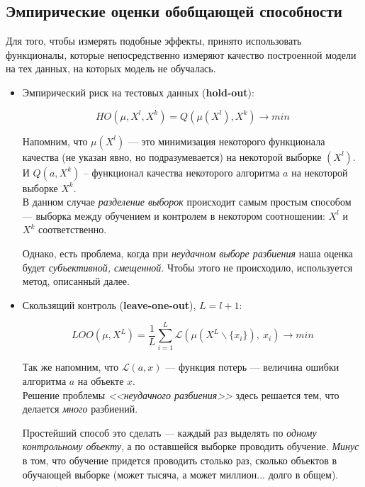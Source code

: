 \documentclass{article}
\begin{document}
\newpage
\subsection{Эмпирические оценки обобщающей способности}

Для того, чтобы измерять подобные эффекты, принято использовать функционалы, которые непосредственно измеряют качество построенной модели на тех данных, на которых модель не обучалась.



\begin{itemize}
\item Эмпирический риск на тестовых данных (\textbf{hold-out}):

$$HO(\mu, X^l, X^k) = Q(\mu(X^l), X^k) \rightarrow min$$

Напомним, что $\mu(X^l)$ --- это минимизация некоторого функционала качества (не указан явно, но подразумевается) на некоторой выборке $(X^l)$.\\И $Q(a, X^k)$ -- функционал качества некоторого алгоритма $a$ на некоторой выборке $X^k$.
\\

В данном случае \textit{разделение выборок} происходит самым простым способом --- выборка между обучением и контролем в некотором соотношении: $X^l$ и $X^k$ соответственно.

Однако, есть проблема, когда при \textit{неудачном выборе разбиения} наша оценка будет \textit{субъективной, смещенной}. Чтобы этого не происходило, используется метод, описанный далее.

\item Скользящий контроль (\textbf{leave-one-out}), $L = l + 1$:

$$LOO(\mu, X^L) =
\frac{1}{L}\sum\limits_{i = 1}^L \mathscr{L}(\mu(X^L \backslash \{x_i\}),\ x_i) \rightarrow min$$

Так же напомним, что $\mathscr{L}(a, x)$ --- функция потерь --- величина ошибки алгоритма $a$ на объекте $x$.
\\

Решение проблемы \textit{<<неудачного разбиения>>} здесь решается тем, что делается \textit{много} разбиений.

Простейший способ это сделать --- каждый раз выделять по \textit{одному контрольному объекту}, а по оставшейся выборке проводить обучение. \textit{Минус} в том, что обучение придется проводить столько раз, сколько объектов в обучающей выборке (может тысяча, а может миллион... долго в общем).


\end{itemize}
\end{document}
